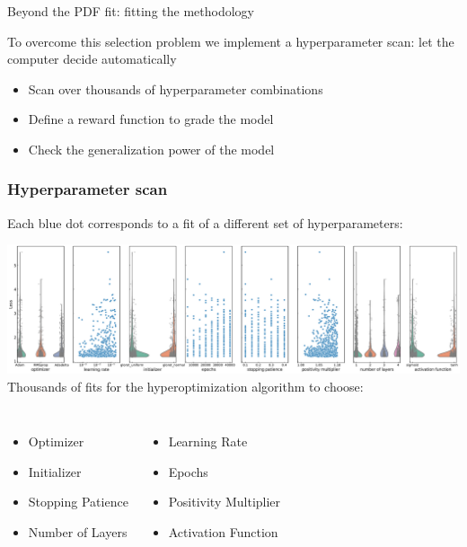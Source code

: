 \begin{frame}{Beyond the PDF fit: fitting the methodology}
    \vspace{0.2cm}

    To overcome this selection problem we implement a {\color{blue}  hyperparameter scan}: let the computer decide automatically

    \begin{itemize}
        \item[\gct] Scan over thousands of hyperparameter combinations
        \item[\gct] Define a reward function to grade the model
        \item[\gct] Check the generalization power of the model
    \end{itemize}

\end{frame}

\begin{frame}
    \frametitle{Hyperparameter scan} 
    Each blue dot corresponds to a fit of a different set of hyperparameters:
    { 
        \centering 

        \includegraphics[width=\textwidth]{juan_future_hyperopt/dis-fullpage.pdf}
        Thousands of fits for the hyperoptimization algorithm to choose:

        \begin{columns} \small
            \column{0.35\paperwidth}
            \begin{itemize}
                \item[\bct] Optimizer
                \item[\bct] Initializer
                \item[\bct] Stopping Patience
                \item[\bct] Number of Layers
            \end{itemize}
            \column{0.35\paperwidth}
            \begin{itemize}
                \item[\bct] Learning Rate
                \item[\bct] Epochs
                \item[\bct] Positivity Multiplier
                \item[\bct] Activation Function
            \end{itemize}
        \end{columns}
    } \vfill
\end{frame}

